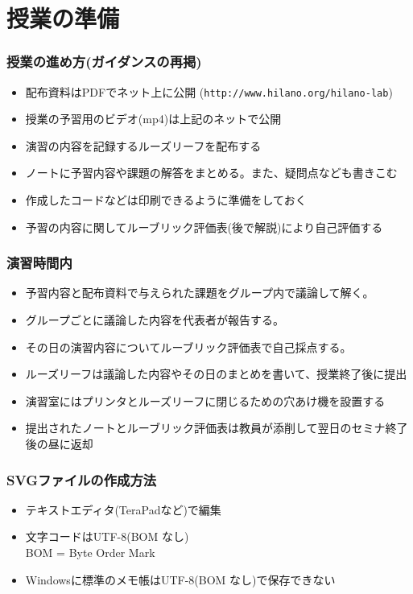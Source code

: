 \section{授業の準備}
\begin{frame}[containsverbatim]
 \frametitle{授業の進め方(ガイダンスの再掲)}
 \begin{itemize}
\item 配布資料はPDFでネット上に公開
      (\texttt{http://www.hilano.org/hilano-lab})
\item 授業の予習用のビデオ(mp4)は上記のネットで公開
\item 演習の内容を記録するルーズリーフを配布する
  \item ノートに予習内容や課題の解答をまとめる。また、疑問点なども書きこむ
  \item 作成したコードなどは印刷できるように準備をしておく
  \item 予習の内容に関してルーブリック評価表(後で解説)により自己評価する
 \end{itemize}
\end{frame}
\begin{frame}
\frametitle{演習時間内}
 \begin{itemize}
\item 予習内容と配布資料で与えられた課題をグループ内で議論して解く。
\item グループごとに議論した内容を代表者が報告する。
  \item その日の演習内容についてルーブリック評価表で自己採点する。
\item ルーズリーフは議論した内容やその日のまとめを書いて、授業終了後に提出
  \item 演習室にはプリンタとルーズリーフに閉じるための穴あけ機を設置する
\item 提出されたノートとルーブリック評価表は教員が添削して翌日のセミナ終了後の昼に返却
 \end{itemize}
\end{frame}
\begin{frame}[containsverbatim]
 \frametitle{SVGファイルの作成方法}
\begin{itemize}
 \item テキストエディタ(TeraPadなど)で編集
 \item 文字コードはUTF-8(BOM なし)\\
       BOM = Byte Order Mark
 \item Windowsに標準のメモ帳はUTF-8(BOM なし)で{\color{red}保存できない}
\end{itemize}
\end{frame}
